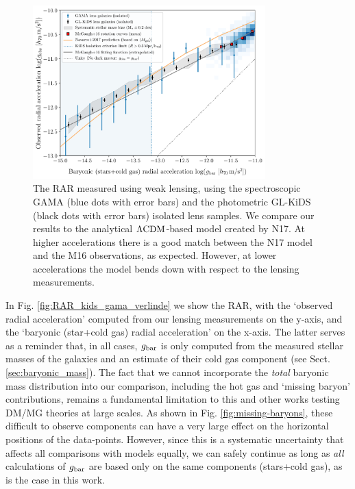 \documentclass[usenatbib]{mnras}
\newcommand{\lcdm}{{\rm \Lambda CDM}}
\newcommand{\un}[1]{_{\rm #1}}
\begin{document}
\begin{figure}
	\includegraphics[width=0.8\textwidth]{Figures/RAR_KiDS+GAMA+Navarro_Nobins_isolated.pdf}
	\caption{The RAR measured using weak lensing, using the spectroscopic GAMA (blue dots with error bars) and the photometric GL-KiDS (black dots with error bars) isolated lens samples. We compare our results to the analytical $\lcdm$-based model created by N17. At higher accelerations there is a good match between the N17 model and the M16 observations, as expected. However, at lower accelerations the model bends down with respect to the lensing measurements.}
	\label{fig:RAR_kids_gama_Navarro}
\end{figure}

In Fig. \ref{fig:RAR_kids_gama_verlinde} we show the RAR, with the `observed radial acceleration' computed from our lensing measurements on the y-axis, and the `baryonic (star+cold gas) radial acceleration' on the x-axis. The latter serves as a reminder that, in all cases, $g\un{bar}$ is only computed from the measured stellar masses of the galaxies and an estimate of their cold gas component (see Sect. \ref{sec:baryonic_mass}). The fact that we cannot incorporate the \emph{total} baryonic mass distribution  into our comparison, including the hot gas and `missing baryon' contributions, remains a fundamental limitation to this and other works testing DM/MG theories at large scales. As shown in Fig. \ref{fig:missing-baryons}, these difficult to observe components can have a very large effect on the horizontal positions of the data-points. However, since this is a systematic uncertainty that affects all comparisons with models equally, we can safely continue as long as \emph{all} calculations of $g\un{bar}$ are based only on the same components (stars+cold gas), as is the case in this work.
\end{document}
